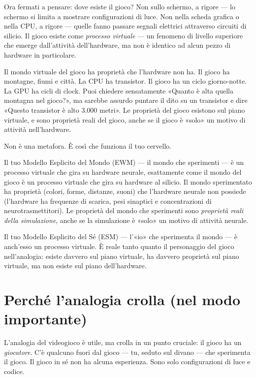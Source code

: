 \documentclass[11pt, twoside, openright]{book}
\begin{document}
Ora fermati a pensare: dove esiste il gioco? Non sullo schermo, a rigore --- lo schermo si limita a mostrare configurazioni di luce. Non nella scheda grafica o nella CPU, a rigore --- quelle fanno passare segnali elettrici attraverso circuiti di silicio. Il gioco esiste come \textit{processo virtuale} --- un fenomeno di livello superiore che emerge dall'attività dell'hardware, ma non è identico ad alcun pezzo di hardware in particolare.

Il mondo virtuale del gioco ha proprietà che l'hardware non ha. Il gioco ha montagne, fiumi e città. La CPU ha transistor. Il gioco ha un ciclo giorno-notte. La GPU ha cicli di clock. Puoi chiedere sensatamente «Quanto è alta quella montagna nel gioco?», ma sarebbe assurdo puntare il dito su un transistor e dire «Questo transistor è alto 3.000 metri». Le proprietà del gioco esistono sul piano virtuale, e sono proprietà reali del gioco, anche se il gioco è «solo» un motivo di attività nell'hardware.

Non è una metafora. È così che funziona il tuo cervello.

Il tuo Modello Esplicito del Mondo (EWM) --- il mondo che sperimenti --- è un processo virtuale che gira su hardware neurale, esattamente come il mondo del gioco è un processo virtuale che gira su hardware al silicio. Il mondo sperimentato ha proprietà (colori, forme, distanze, suoni) che l'hardware neurale non possiede (l'hardware ha frequenze di scarica, pesi sinaptici e concentrazioni di neurotrasmettitori). Le proprietà del mondo che sperimenti sono \textit{proprietà reali della simulazione}, anche se la simulazione è «solo» un motivo di attività neurale.

Il tuo Modello Esplicito del Sé (ESM) --- l'«io» che sperimenta il mondo --- è anch'esso un processo virtuale. È reale tanto quanto il personaggio del gioco nell'analogia: esiste davvero sul piano virtuale, ha davvero proprietà sul piano virtuale, ma non esiste sul piano dell'hardware.

\section*{Perché l'analogia crolla (nel modo importante)}

L'analogia del videogioco è utile, ma crolla in un punto cruciale: il gioco ha un \textit{giocatore}. C'è qualcuno fuori dal gioco --- tu, seduto sul divano --- che sperimenta il gioco. Il gioco in sé non ha alcuna esperienza. Sono solo configurazioni di luce e codice.
\end{document}
